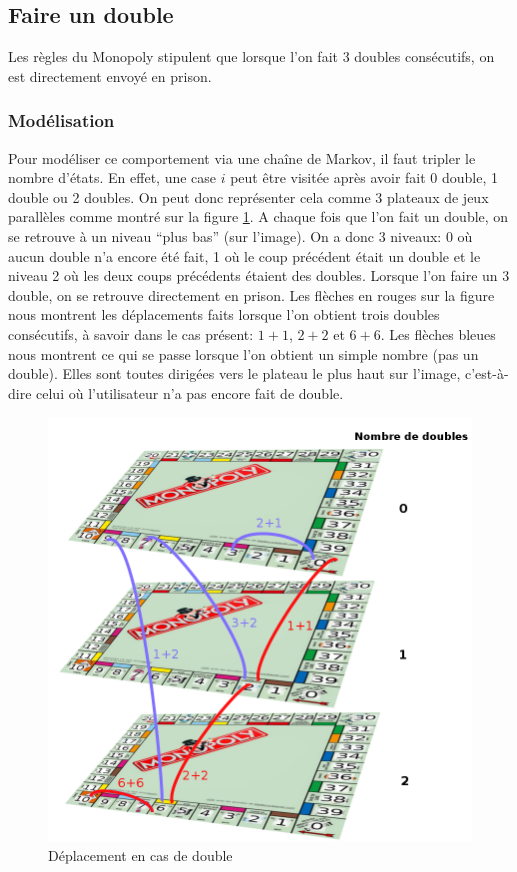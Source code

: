 \documentclass[letterpaper]{article}
\begin{document}
  \subsection{Faire un double}
    Les règles du Monopoly stipulent que lorsque l'on fait 3 doubles
    consécutifs, on est directement envoyé en prison.
    \subsubsection{Modélisation}
      \label{modelisation_double}
      Pour modéliser ce comportement via une
      chaîne de Markov, il faut tripler le nombre d'états.  En effet, une case
      $i$ peut être visitée après avoir fait 0 double, 1 double ou 2 doubles.
      On peut donc représenter cela comme 3 plateaux de jeux parallèles comme
      montré sur la figure \ref{representation_double}.  A chaque fois que l'on
      fait un double, on se retrouve à un niveau ``plus bas'' (sur l'image).
      On a donc 3 niveaux: 0 où aucun double n'a encore été fait, 1 où le coup
      précédent était un double et le niveau 2 où les deux coups précédents
      étaient des doubles. Lorsque l'on faire un 3 double, on se
      retrouve directement en prison.  Les flèches en rouges sur la figure nous
      montrent les déplacements faits lorsque l'on obtient trois doubles
      consécutifs, à savoir dans le cas présent: $1+1$, $2+2$ et $6+6$.  Les
      flèches bleues nous montrent ce qui se passe lorsque l'on obtient un
      simple nombre (pas un double).  Elles sont toutes dirigées vers le
      plateau le plus haut sur l'image, c'est-à-dire celui où l'utilisateur
      n'a pas encore fait de double.
      \begin{figure}[h]
	\centering
	\includegraphics[scale=0.4]{./Images/MonopolyVertical_legende.png}
	  \caption{Déplacement en cas de double}
	  \label{representation_double}
      \end{figure}
\end{document}

